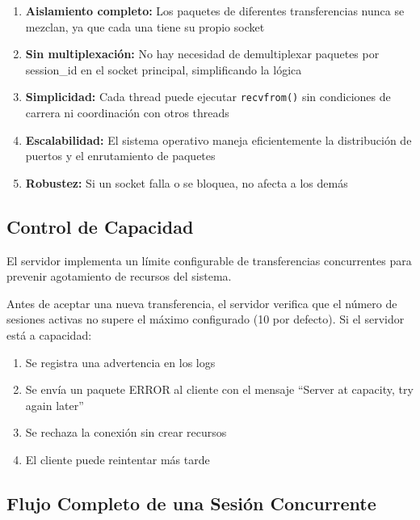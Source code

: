 \begin{enumerate}
    \item \textbf{Aislamiento completo:} Los paquetes de diferentes transferencias nunca se mezclan, ya que cada una tiene su propio socket

    \item \textbf{Sin multiplexación:} No hay necesidad de demultiplexar paquetes por session\_id en el socket principal, simplificando la lógica

    \item \textbf{Simplicidad:} Cada thread puede ejecutar \texttt{recvfrom()} sin condiciones de carrera ni coordinación con otros threads

    \item \textbf{Escalabilidad:} El sistema operativo maneja eficientemente la distribución de puertos y el enrutamiento de paquetes

    \item \textbf{Robustez:} Si un socket falla o se bloquea, no afecta a los demás
\end{enumerate}

\subsection{Control de Capacidad}

El servidor implementa un límite configurable de transferencias concurrentes para prevenir agotamiento de recursos del sistema.

Antes de aceptar una nueva transferencia, el servidor verifica que el número de sesiones activas no supere el máximo configurado (10 por defecto). Si el servidor está a capacidad:

\begin{enumerate}
    \item Se registra una advertencia en los logs
    \item Se envía un paquete ERROR al cliente con el mensaje ``Server at capacity, try again later''
    \item Se rechaza la conexión sin crear recursos
    \item El cliente puede reintentar más tarde
\end{enumerate}

\subsection{Flujo Completo de una Sesión Concurrente}

